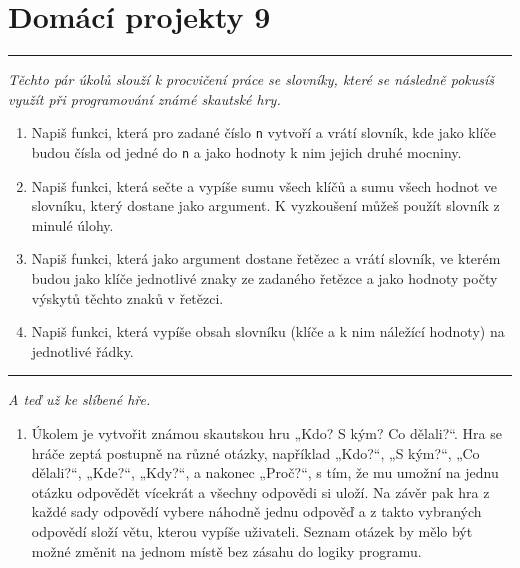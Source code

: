 \documentclass[a4paper,10pt]{article}
\newcommand\plsetno{9}
\newcommand\startsection[1]{
     \vspace{0.2ex}
    \hrule
    {\fontspec{Oxygen} \tiny
     \vspace{-1ex}
     \emph{#1}
     \vspace{-1.5em}
    }
}
\begin{document}
\section*{Domácí projekty \plsetno}

\startsection{Těchto pár úkolů slouží k procvičení práce se slovníky, které se
    následně pokusíš využít při programování známé skautské hry.}

\begin{enumerate}

\item Napiš funkci, která pro zadané číslo \texttt{n} vytvoří a vrátí slovník,
    kde jako klíče budou čísla od jedné do \texttt{n} a jako hodnoty k nim
    jejich druhé mocniny.

\item Napiš funkci, která sečte a vypíše sumu všech klíčů a sumu všech hodnot
    ve slovníku, který dostane jako argument. K vyzkoušení můžeš použít
    slovník z minulé úlohy.

\item Napiš funkci, která jako argument dostane řetězec a vrátí slovník,
    ve kterém budou jako klíče jednotlivé znaky ze zadaného řetězce a jako
    hodnoty počty výskytů těchto znaků v řetězci.

\item Napiš funkci, která vypíše obsah slovníku (klíče a k nim náležící
    hodnoty) na jednotlivé řádky.

\end{enumerate}

\startsection{A teď už ke slíbené hře.}

\begin{enumerate}[resume]

\item Úkolem je vytvořit známou skautskou hru „Kdo? S kým? Co dělali?“. Hra se
    hráče zeptá postupně na různé otázky, například „Kdo?“, „S kým?“,
    „Co dělali?“, „Kde?“, „Kdy?“, a nakonec „Proč?“, s tím, že mu umožní
    na jednu otázku odpovědět vícekrát a všechny odpovědi si uloží.
    Na závěr pak hra z každé sady odpovědí vybere náhodně jednu odpověď
    a z takto vybraných odpovědí složí větu, kterou vypíše uživateli.
    Seznam otázek by mělo být možné změnit na jednom místě bez zásahu
    do logiky programu.

\end{enumerate}
\end{document}
